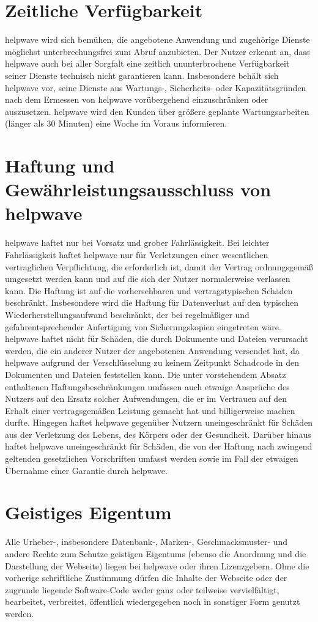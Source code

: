 \documentclass[10pt]{article}
\begin{document}
\section{Zeitliche Verfügbarkeit}
helpwave wird sich bemühen, die angebotene Anwendung und zugehörige Dienste möglichst unterbrechungsfrei zum Abruf
anzubieten. Der Nutzer erkennt an, dass helpwave auch bei aller Sorgfalt eine zeitlich ununterbrochene Verfügbarkeit seiner
Dienste technisch nicht garantieren kann. Insbesondere behält sich helpwave vor, seine Dienste aus Wartungs-, Sicherheits-
oder Kapazitätsgründen nach dem Ermessen von helpwave vorübergehend einzuschränken oder auszusetzen. helpwave wird
den Kunden über größere geplante Wartungsarbeiten (länger als 30 Minuten) eine Woche im Voraus informieren.

\section{Haftung und Gewährleistungsausschluss von helpwave}
helpwave haftet nur bei Vorsatz und grober Fahrlässigkeit. Bei leichter Fahrlässigkeit haftet helpwave nur für Verletzungen
einer wesentlichen vertraglichen Verpflichtung, die erforderlich ist, damit der Vertrag ordnungsgemäß umgesetzt werden
kann und auf die sich der Nutzer normalerweise verlassen kann. Die Haftung ist auf die vorhersehbaren und vertragstypischen Schäden beschränkt. Insbesondere wird die Haftung für Datenverlust auf den typischen Wiederherstellungsaufwand
beschränkt, der bei regelmäßiger und gefahrentsprechender Anfertigung von Sicherungskopien eingetreten wäre. helpwave
haftet nicht für Schäden, die durch Dokumente und Dateien verursacht werden, die ein anderer Nutzer der angebotenen
Anwendung versendet hat, da helpwave aufgrund der Verschlüsselung zu keinem Zeitpunkt Schadcode in den Dokumenten
und Dateien feststellen kann.
Die unter vorstehendem Absatz enthaltenen Haftungsbeschränkungen umfassen auch etwaige Ansprüche des Nutzers auf
den Ersatz solcher Aufwendungen, die er im Vertrauen auf den Erhalt einer vertragsgemäßen Leistung gemacht hat und
billigerweise machen durfte.
Hingegen haftet helpwave gegenüber Nutzern uneingeschränkt für Schäden aus der Verletzung des Lebens, des Körpers
oder der Gesundheit. Darüber hinaus haftet helpwave uneingeschränkt für Schäden, die von der Haftung nach zwingend
geltenden gesetzlichen Vorschriften umfasst werden sowie im Fall der etwaigen Übernahme einer Garantie durch helpwave.

\section{Geistiges Eigentum}
Alle Urheber-, insbesondere Datenbank-, Marken-, Geschmacksmuster- und andere Rechte zum Schutze geistigen Eigentums (ebenso die Anordnung und die Darstellung der Webseite) liegen bei helpwave oder ihren Lizenzgebern. Ohne die vorherige
schriftliche Zustimmung dürfen die Inhalte der Webseite oder der zugrunde liegende Software-Code weder ganz oder teilweise vervielfältigt, bearbeitet, verbreitet, öffentlich wiedergegeben noch in sonstiger Form genutzt werden.
\end{document}
